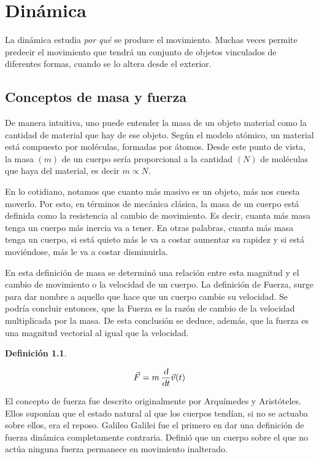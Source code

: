 \documentclass[a5paper,12pt,twoside]{book}
\newtheorem{defn}{{Definición}}[chapter]
\begin{document}
\chapter{Dinámica}
\label{cha:dinamics}


La dinámica estudia \emph{por qué} se produce el movimiento.
Muchas veces permite predecir el movimiento que tendrá un conjunto de objetos vinculados de diferentes formas, cuando se lo altera desde el exterior.


\section{Conceptos de masa y fuerza}

De manera intuitiva, uno puede entender la masa de un objeto material como la cantidad de material que hay de ese objeto.
Según el modelo atómico, un material está compuesto por moléculas, formadas por átomos.
Desde este punto de vista, la masa $(m)$ de un cuerpo sería proporcional a la cantidad $(N)$ de moléculas que haya del material, es decir $ m \propto N $.

En lo cotidiano, notamos que cuanto más masivo es un objeto, más nos cuesta moverlo.
Por esto, en términos de mecánica clásica, la masa de un cuerpo está definida como la resistencia al cambio de movimiento.
Es decir, cuanta más masa tenga un cuerpo más inercia va a tener.
En otras palabras, cuanta más masa tenga un cuerpo, si está quieto más le va a costar aumentar su rapidez y si está moviéndose, más le va a costar disminuirla.

En esta definición de masa se determinó una relación entre esta magnitud y el cambio de movimiento o la velocidad de un cuerpo.
La definición de Fuerza, surge para dar nombre a aquello que hace que un cuerpo cambie su velocidad.
Se podría concluir entonces, que la Fuerza es la razón de cambio de la velocidad multiplicada por la masa.
De esta conclusión se deduce, además, que la fuerza es una magnitud vectorial al igual que la velocidad.

\begin{mdframed}[style=MyFrame1]
    \begin{defn}
        \label{defn:force}
    \end{defn}
    \begin{equation*}
        \Vec{F} = m \, \frac{\textsl{d}}{\textsl{d} t} \Vec{v}(t)
    \end{equation*}
\end{mdframed}

El concepto de fuerza fue descrito originalmente por Arquímedes y Aristóteles.
Ellos suponían que el estado natural al que los cuerpos tendían, si no se actuaba sobre ellos, era el reposo.
Galileo Galilei fue el primero en dar una definición de fuerza dinámica completamente contraria.
Definió que un cuerpo sobre el que no actúa ninguna fuerza permanece en movimiento inalterado.
\end{document}
